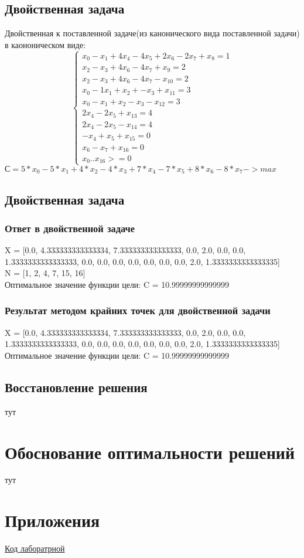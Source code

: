 \documentclass[a4]{article}
\begin{document}
			\subsection{Двойственная задача}
			Двойственная к поставленной задаче(из канонического вида поставленной задачи) в каононическом виде:
			\begin{equation*}
				\begin{cases}
					x_0 -x_1 + 4x_4 - 4x_5 + 2x_6 - 2x_7 + x_8 = 1\\
					x_2 - x_3 + 4x_6 - 4x_7 + x_9 = 2\\
					x_2 -x_3 + 4x_6 - 4x_7 - x_10 = 2\\
					x_0 -1x_1 + x_2 + -x_3 + x_11 = 3\\
					x_0 - x_1 + x_2 -x_3 - x_12 = 3\\
					2x_4 - 2x_5 + x_13 = 4\\
					2x_4 -2x_5 - x_14 = 4\\
					-x_4 + x_5 + x_15 = 0\\
					x_6 -x_7 + x_16 = 0\\
					x_0.. x_16 >= 0 
				\end{cases}
			\end{equation*}
			$С = 5*x_0 - 5*x_1 + 4*x_2 - 4*x_3 + 7*x_4 - 7*x_5 + 8*x_6 - 8*x_7->max$
			
			\subsection{Двойственная задача}
				\subsubsection{Ответ в двойственной задаче}
					X = [0.0, 4.333333333333334, 7.333333333333333, 0.0, 2.0, 0.0, 0.0, 1.3333333333333333, 0.0, 0.0, 0.0, 0.0, 0.0, 0.0, 0.0, 2.0, 1.3333333333333335]\\
					
					N = [1, 2, 4, 7, 15, 16]\\
					
					Оптимальное значение функции цели: C = 10.99999999999999
				\subsubsection{Результат методом крайних точек для двойственной задачи}
					X = [0.0, 4.333333333333334, 7.333333333333333, 0.0, 2.0, 0.0, 0.0, 1.3333333333333333, 0.0, 0.0, 0.0, 0.0, 0.0, 0.0, 0.0, 2.0, 1.3333333333333335]\\
					
					Оптимальное значение функции цели: C = 10.99999999999999
			\subsection{Восстановление решения}
			{тут}
	\section{Обоснование оптимальности решений}
		{тут}
	\section{Приложения}
		\href{https://github.com/LuciusGen/MetOpt/tree/master/venv}{Код лаборатрной}
	
\end{document}
